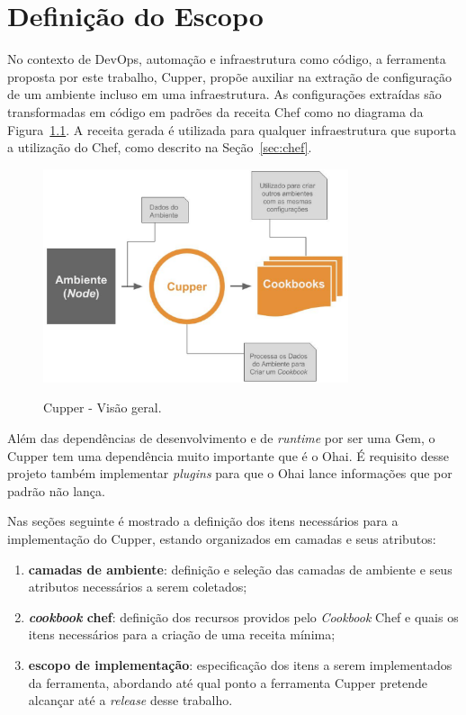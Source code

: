\newpage\null\thispagestyle{empty}\newpage
\chapter{Definição do Escopo}
\label{chap:lev_es}

No contexto de DevOps, automação e infraestrutura como código, a ferramenta
proposta por este trabalho, Cupper, propõe auxiliar na extração de configuração
de um ambiente incluso em uma infraestrutura. As configurações extraídas são
transformadas em código em padrões da receita Chef como 
no diagrama da Figura~\ref{fig:cupper_geral}. A
receita gerada é utilizada para qualquer infraestrutura que suporta a
utilização do Chef, como descrito na Seção~\ref{sec:chef}.

\begin{figure}[]
  \centering
  \includegraphics[width=0.8\textwidth]{figuras/cupper_geral.eps}
  \label{fig:cupper_geral}
  \caption{Cupper - Visão geral.}
\end{figure}

Além das dependências de desenvolvimento e de \textit{runtime} por ser uma Gem,
o Cupper tem uma dependência muito
importante que é o Ohai. É requisito desse projeto também implementar
\textit{plugins} para que o Ohai lance informações que por padrão 
não lança.

Nas seções seguinte é mostrado a definição dos itens necessários para
a implementação do Cupper, estando organizados em camadas e seus atributos:

\begin{enumerate}
  \item \textbf{camadas de ambiente}: definição e seleção das camadas de ambiente
    e seus atributos necessários a serem coletados;
  \item \textbf{\textit{cookbook} chef}: definição dos recursos providos pelo \textit{Cookbook} Chef e quais os
    itens necessários para a criação de uma receita mínima;
  \item \textbf{escopo de implementação}: especificação dos itens a serem implementados
    da ferramenta, abordando até qual ponto a ferramenta Cupper pretende alcançar
    até a \textit{release} desse trabalho.
\end{enumerate}





